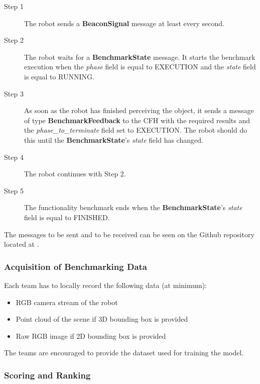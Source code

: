 \begin{description}
\item[Step 1] The robot sends a \textbf{BeaconSignal} message at least every second.
\item[Step 2] The robot waits for a \textbf{BenchmarkState} message. It starts the benchmark execution when the \emph{phase} field is equal to EXECUTION and the \emph{state} field is equal to RUNNING.
\item[Step 3] As soon as the robot has finished perceiving the object, it sends a message of type \textbf{BenchmarkFeedback} to the CFH with the required results and the \emph{phase\_to\_terminate} field set to EXECUTION. The robot should do this until the \textbf{BenchmarkState}'s \emph{state} field has changed.
\item[Step 4] The robot continues with Step 2.
\item[Step 5] The functionality benchmark ends when the \textbf{BenchmarkState}'s \emph{state} field is equal to FINISHED.
\end{description}
\noindent
The messages to be sent and to be received can be seen on the Github repository located at \cite{rockin:CFHMessages}.

\subsubsection{Acquisition of Benchmarking Data}
\label{sssec:ObjectPerceptionData}

Each team has to locally record the following data (at minimum):
\begin{itemize}
	\item RGB camera stream of the robot
	\item Point cloud of the scene if 3D bounding box is provided
	\item Raw RGB image if 2D bounding box is provided
\end{itemize}

The teams are encouraged to provide the dataset used for training the model.

\subsubsection{Scoring and Ranking}
\label{sssec:ObjectPerceptionScoring}

